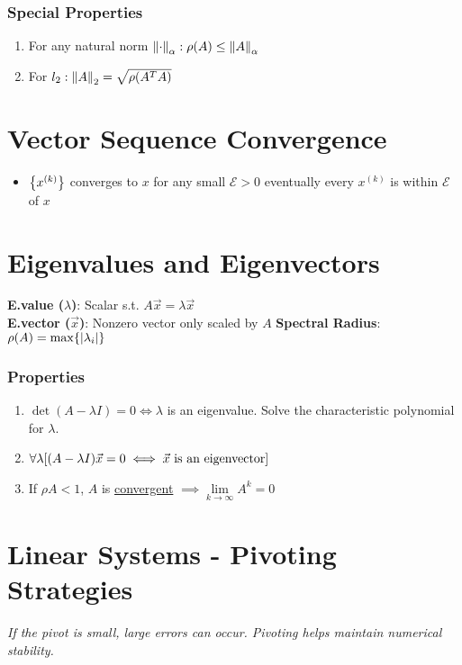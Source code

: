 \documentclass[8pt, letterpaper]{extarticle}
\newcommand{\bigEps}{\mathcal{E}}
\begin{document}
\begin{multicols*}{3}
  \subsubsection{Special Properties}
  \begin{enumerate}
    \item For any natural norm $\norm{\cdot}_\alpha:\rho(A) \leq \norm{A}_\alpha$
    \item For $l_2:\norm{A}_2 = \sqrt{\rho(A^TA)}$
  \end{enumerate}

  \section{Vector Sequence Convergence}
  \begin{itemize}
    \item $\Bqty{x^{(k)}}$ converges to $x$ for any small $\bigEps > 0$
      eventually every $x^{(k)}$ is within $\bigEps$ of $x$
  \end{itemize}

  \section{Eigenvalues and Eigenvectors}
  \textbf{E.value ($\lambda$)}: Scalar s.t. $A\vec{x} = \lambda \vec{x}$ \\
  \textbf{E.vector ($\vec{x}$)}: Nonzero vector only scaled by $A$
  \textbf{Spectral Radius}: $\rho(A) = \max \{\abs{\lambda_i}\}$
  \subsubsection{Properties}
  \begin{enumerate}
    \item $\det(A-\lambda I) = 0 \iff \lambda$ is an eigenvalue. Solve the
      characteristic polynomial for $\lambda$.
    \item $\forall \lambda \bqty{(A-\lambda I)\vec{x} = 0 \iff \vec x \text{ is an
      eigenvector}}$
    \item If $\rho A < 1$, $A$ is \uline{convergent} $\implies 
      \underset{k\to\infty}{\lim} A^k = 0$
  \end{enumerate}

  \section{Linear Systems - Pivoting Strategies}
  \textit{If the pivot is small, large errors can occur. Pivoting helps maintain numerical stability.}


\end{multicols*}
\end{document}
